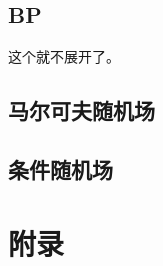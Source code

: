 \documentclass[12pt]{article}
\begin{document}
\subsection{BP}
这个就不展开了。

\subsection{马尔可夫随机场}

\subsection{条件随机场}

\newpage
\section{附录}
\end{document}
